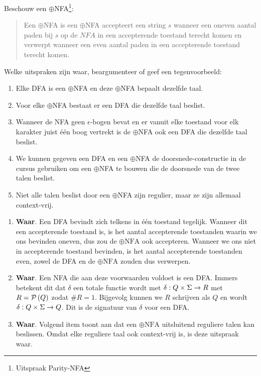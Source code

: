 \documentclass{article}
\begin{document}
\begin{question}
Beschouw een $\oplus$NFA\footnote{Uitspraak Parity-NFA}:
\begin{quote}
\begin{definition}
Een $\oplus$NFA is een $\oplus$NFA accepteert een string $s$ wanneer een oneven aantal paden bij $s$ op de $NFA$ in een accepterende toestand terecht komen en verwerpt wanneer een even aantal paden in een accepterende toestand terecht komen.
\end{definition}
\end{quote}
Welke uitspraken zijn waar, beargumenteer of geef een tegenvoorbeeld:
\begin{enumerate}
 \item Elke DFA is een $\oplus$NFA en deze $\oplus$NFA bepaalt dezelfde taal.
 \item Voor elke $\oplus$NFA bestaat er een DFA die dezelfde taal beslist.
 \item Wanneer de NFA geen $\epsilon$-bogen bevat en er vanuit elke toestand voor elk karakter juist \'e\'en boog vertrekt is de $\oplus$NFA ook een DFA die dezelfde taal beslist.
 \item We kunnen gegeven een DFA en een $\oplus$NFA de doorsnede-constructie in de cursus gebruiken om een $\oplus$NFA te bouwen die de doorsnede van de twee talen beslist.
 \item Niet alle talen beslist door een $\oplus$NFA zijn regulier, maar ze zijn allemaal context-vrij.
\end{enumerate}
\begin{answer}
\begin{enumerate}
 \item \textbf{Waar}. Een DFA bevindt zich telkens in \'e\'en toestand tegelijk. Wanneer dit een accepterende toestand is, is het aantal accepterende toestanden waarin we ons bevinden oneven, dus zou de $\oplus\mbox{NFA}$ ook accepteren. Wanneer we ons niet in accepterende toestand bevinden, is het aantal accepterende toestanden even, zowel de DFA en de $\oplus\mbox{NFA}$ zouden dus verwerpen.
 \item \textbf{Waar}. Een NFA die aan deze voorwaarden voldoet is een DFA. Immers betekent dit dat $\delta$ een totale functie wordt met $\delta:Q\times\Sigma\rightarrow R$ met $R=\mathcal{P}\left( Q \right)$ zodat $\# R=1$. Bijgevolg kunnen we $R$ schrijven als $Q$ en wordt $\delta:Q\times\Sigma\rightarrow Q$. Dit is de signatuur van $\delta$ voor een DFA.
 \item \textbf{Waar}. Volgend item toont aan dat een $\oplus\mbox{NFA}$ uitsluitend reguliere talen kan beslissen. Omdat elke reguliere taal ook context-vrij is, is deze uitspraak waar.

\end{enumerate}
\end{answer}
\end{question}
\end{document}
